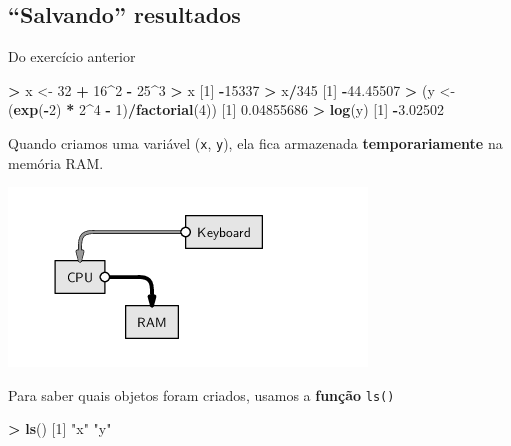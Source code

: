 \documentclass[10pt,a4paper]{book}
\newenvironment{Shaded}{\begin{snugshade}}{\end{snugshade}}
\newcommand{\KeywordTok}[1]{\textcolor[rgb]{0.13,0.29,0.53}{\textbf{#1}}}
\newcommand{\DecValTok}[1]{\textcolor[rgb]{0.00,0.00,0.81}{#1}}
\newcommand{\FloatTok}[1]{\textcolor[rgb]{0.00,0.00,0.81}{#1}}
\newcommand{\StringTok}[1]{\textcolor[rgb]{0.31,0.60,0.02}{#1}}
\newcommand{\OperatorTok}[1]{\textcolor[rgb]{0.81,0.36,0.00}{\textbf{#1}}}
\newcommand{\NormalTok}[1]{#1}
\begin{document}
\subsection{\texorpdfstring{``Salvando''
resultados}{Salvando resultados}}\label{salvando-resultados}

Do exercício anterior

\begin{Shaded}
\begin{Highlighting}[]
\OperatorTok{>}\StringTok{ }\NormalTok{x <-}\StringTok{ }\DecValTok{32} \OperatorTok{+}\StringTok{ }\DecValTok{16}\OperatorTok{^}\DecValTok{2} \OperatorTok{-}\StringTok{ }\DecValTok{25}\OperatorTok{^}\DecValTok{3}
\OperatorTok{>}\StringTok{ }\NormalTok{x}
\NormalTok{[}\DecValTok{1}\NormalTok{] }\OperatorTok{-}\DecValTok{15337}
\OperatorTok{>}\StringTok{ }\NormalTok{x}\OperatorTok{/}\DecValTok{345}
\NormalTok{[}\DecValTok{1}\NormalTok{] }\OperatorTok{-}\FloatTok{44.45507}
\OperatorTok{>}\StringTok{ }\NormalTok{(y <-}\StringTok{ }\NormalTok{(}\KeywordTok{exp}\NormalTok{(}\OperatorTok{-}\DecValTok{2}\NormalTok{) }\OperatorTok{*}\StringTok{ }\DecValTok{2}\OperatorTok{^}\DecValTok{4} \OperatorTok{-}\StringTok{ }\DecValTok{1}\NormalTok{)}\OperatorTok{/}\KeywordTok{factorial}\NormalTok{(}\DecValTok{4}\NormalTok{))}
\NormalTok{[}\DecValTok{1}\NormalTok{] }\FloatTok{0.04855686}
\OperatorTok{>}\StringTok{ }\KeywordTok{log}\NormalTok{(y)}
\NormalTok{[}\DecValTok{1}\NormalTok{] }\OperatorTok{-}\FloatTok{3.02502}
\end{Highlighting}
\end{Shaded}

Quando criamos uma variável (\texttt{x}, \texttt{y}), ela fica
armazenada \textbf{temporariamente} na memória RAM.

\begin{center}\includegraphics[width=0.5\linewidth]{img/script-assign} \end{center}

Para saber quais objetos foram criados, usamos a \textbf{função}
\texttt{ls()}

\begin{Shaded}
\begin{Highlighting}[]
\OperatorTok{>}\StringTok{ }\KeywordTok{ls}\NormalTok{()}
\NormalTok{[}\DecValTok{1}\NormalTok{] }\StringTok{"x"} \StringTok{"y"}
\end{Highlighting}
\end{Shaded}
\end{document}
